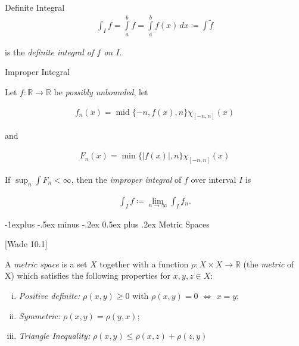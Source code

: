 \documentclass[10pt]{article} %
\makeatletter
\newcommand{\cw}[1]{[Wade #1]}
\renewcommand{\leq}{\leqslant}
\renewcommand{\geq}{\geqslant}
\DeclareMathOperator{\Middle}{mid}
\renewcommand{\subsection}{\@startsection{subsection}{2}{0mm}%
                                {-1explus -.5ex minus -.2ex}%
                                {0.5ex plus .2ex}%
                                {\normalfont\normalsize\bfseries}}
\makeatother
\begin{document}
\begin{multicols}{3}
\begin{definition}{}{Definite Integral}
        \begin{align*}
            \int_I f = \int\limits_a^b f = \int\limits_a^b f(x) \,dx \coloneqq \int \tilde{f}
        \end{align*}

    is the \emph{definite integral of $f$ on $I$}.

\end{definition}

\begin{definition}{}{Improper Integral}

    Let $f: \mathbb{R} \to \mathbb{R}$ be \emph{possibly unbounded}, let

        \begin{align*}
            f_n(x) = \Middle\{-n,f(x),n\}\chi_{[-n,n]}(x)
        \end{align*}

    and

        \begin{align*}
            F_n(x) = \min\{|f(x)|,n\}\chi_{[-n,n]}(x)
        \end{align*}

    If $\sup_{n}\int F_n < \infty$, then the \emph{improper integral} of $f$ over interval $I$ is

        \begin{align*}
            \int_I f \coloneqq \lim_{n \to \infty} \int_I f_n.
        \end{align*}

\end{definition}


\subsection{Metric Spaces}

\begin{definition}{\cw{10.1}}{}

    A \emph{metric space} is a set $X$ together with a function $\rho: X \times X \to \mathbb{R}$ (the \emph{metric} of X) which satisfies the following properties for $x,y,z \in X$:

        \begin{enumerate}[(i)]
            \setlength{\parskip}{0em}
            \item \emph{Positive definite:} $\rho(x,y) \geq 0$ with $\rho(x,y) = 0$ $\Leftrightarrow$ $x = y$;
            \item \emph{Symmetric:} $\rho(x,y) = \rho(y,x)$;
            \item \emph{Triangle Inequality:} $\rho(x,y) \leq \rho(x,z) + \rho(z,y)$
        \end{enumerate}


\end{definition}
\end{multicols}
\end{document}
